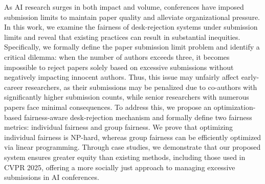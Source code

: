 

As AI research surges in both impact and volume, conferences have imposed submission limits to maintain paper quality and alleviate organizational pressure. 
In this work, we examine the fairness of desk-rejection systems under submission limits and reveal that existing practices can result in substantial inequities. Specifically, we formally define the paper submission limit problem and identify a critical dilemma: when the number of authors exceeds three, it becomes impossible to reject papers solely based on excessive submissions without negatively impacting innocent authors.
Thus, this issue may unfairly affect early-career researchers, as their submissions may be penalized due to co-authors with significantly higher submission counts, while senior researchers with numerous papers face minimal consequences. To address this, we propose an optimization-based fairness-aware desk-rejection mechanism and formally define two fairness metrics: individual fairness and group fairness. We prove that optimizing individual fairness is NP-hard, whereas group fairness can be efficiently optimized via linear programming. Through case studies, we demonstrate that our proposed system ensures greater equity than existing methods, including those used in CVPR 2025, offering a more socially just approach to managing excessive submissions in AI conferences.


